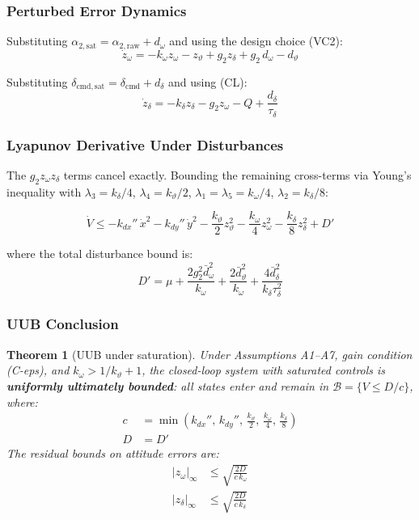 \documentclass[11pt,a4paper]{article}
\theoremstyle{plain}
\newtheorem{theorem}{Theorem}[section]
\theoremstyle{remark}
\newcommand{\vth}{\vartheta}
\newcommand{\zth}{z_{\vth}}
\newcommand{\zom}{z_{\omega}}
\newcommand{\zdel}{z_{\delta}}
\newcommand{\dcmd}{\delta_{\mathrm{cmd}}}
\begin{document}
\subsubsection{Perturbed Error Dynamics}

Substituting $\alpha_{2,\mathrm{sat}} = \alpha_{2,\mathrm{raw}} + d_\omega$ and using the design choice (VC2):
\[
  \dot\zom = -k_\omega\zom - \zth + g_2\zdel + g_2\,d_\omega - d_\vartheta
\]

Substituting $\delta_{\mathrm{cmd},\mathrm{sat}} = \dcmd + d_\delta$ and using (CL):
\[
  \dot\zdel = -k_\delta\zdel - g_2\zom - Q + \frac{d_\delta}{\tau_\delta}
\]

\subsubsection{Lyapunov Derivative Under Disturbances}

The $g_2\zom\zdel$ terms cancel exactly. Bounding the remaining cross-terms via Young's inequality with $\lambda_3 = k_\delta/4$, $\lambda_4 = k_\vth/2$, $\lambda_1 = \lambda_5 = k_\omega/4$, $\lambda_2 = k_\delta/8$:

\begin{equation}
  \dot V \leq -k_{dx}''\,\dot x^2 - k_{dy}''\,\dot y^2 - \frac{k_\vth}{2}\zth^2 - \frac{k_\omega}{4}\zom^2 - \frac{k_\delta}{8}\zdel^2 + D'
  \tag{ISS4}
\end{equation}

where the total disturbance bound is:
\begin{equation}
  D' = \mu + \frac{2g_2^2\bar{d}_\omega^2}{k_\omega} + \frac{2\bar{d}_\vartheta^2}{k_\omega} + \frac{4\bar{d}_\delta^2}{k_\delta\tau_\delta^2}
\end{equation}

\subsubsection{UUB Conclusion}

\begin{theorem}[UUB under saturation]
Under Assumptions A1--A7, gain condition (C-eps), and $k_\omega > 1/k_\vth + 1$, the closed-loop system with saturated controls is \textbf{uniformly ultimately bounded}: all states enter and remain in $\mathcal{B} = \{V \leq D/c\}$, where:
\begin{align}
  c &= \min\!\left(k_{dx}'',\, k_{dy}'',\, \frac{k_\vth}{2},\, \frac{k_\omega}{4},\, \frac{k_\delta}{8}\right) \\
  D &= D'
\end{align}
The residual bounds on attitude errors are:
\begin{align}
  |z_\omega|_{\infty} &\leq \sqrt{\frac{2D}{c\,k_\omega}} \\
  |z_\delta|_{\infty} &\leq \sqrt{\frac{2D}{c\,k_\delta}}
\end{align}
\end{theorem}
\end{document}
